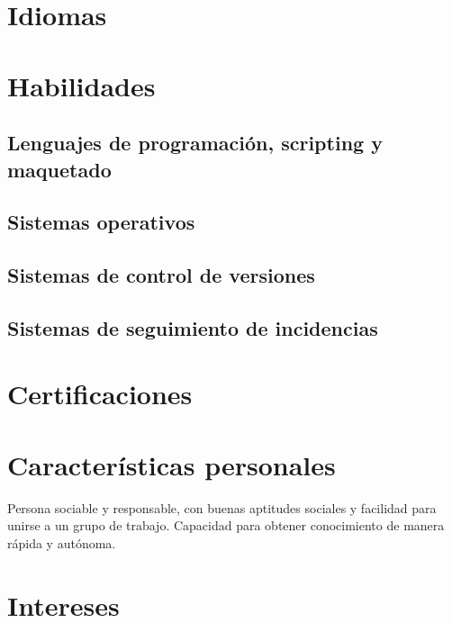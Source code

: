 \documentclass[12pt,a4paper]{moderncv}
\begin{document}
\section{Idiomas}
\section{Habilidades}
\subsection{Lenguajes de programación, scripting y maquetado}
\subsection{Sistemas operativos}
\subsection{Sistemas de control de versiones}
\subsection{Sistemas de seguimiento de incidencias}
\section{Certificaciones}
\section{Características personales}
Persona sociable y responsable, con buenas aptitudes sociales y facilidad para unirse a un grupo de trabajo.
Capacidad para obtener conocimiento de manera rápida y autónoma.

\section{Intereses}
\renewcommand{\listitemsymbol}{} %
\end{document}
